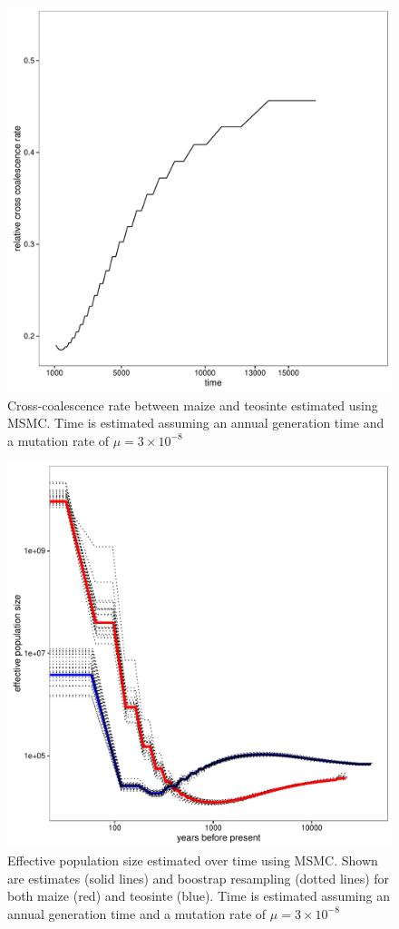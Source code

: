 \begin{figure}
  \begin{center}
    \includegraphics[width=.85\textwidth]{FigsAndFiles/relativeCrossCoalescenceRate.pdf}
    \end{center}
\caption{Cross-coalescence rate between maize and teosinte estimated using MSMC. Time is estimated assuming an annual generation time and a mutation rate of $\mu=3\times 10^{-8}$ \label{sFig:coalescense}}
\end{figure}
\clearpage


\begin{figure}
  \begin{center}
    \includegraphics[width=.85\textwidth]{FigsAndFiles/TIL_BKN_bootstrapping_msmc2.pdf}
    \end{center}
\caption{Effective population size estimated over time using MSMC. Shown are estimates (solid lines) and boostrap resampling (dotted lines) for both maize (red) and teosinte (blue). Time is estimated assuming an annual generation time and a mutation rate of $\mu=3\times 10^{-8}$ \label{sFig:msmc}}
\end{figure}
\clearpage

